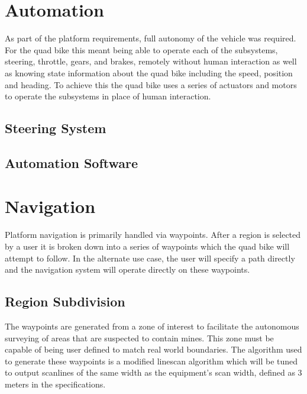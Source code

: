 \documentclass[main.tex]{subfiles}
\begin{document}
\section{Automation}

As part of the platform requirements, full autonomy of the vehicle was required. For the quad bike this meant being able to operate each of the subsystems, steering, throttle, gears, and brakes, remotely without human interaction as well as knowing state information about the quad bike including the speed, position and heading. To achieve this the quad bike uses a series of actuators and motors to operate the subsystems in place of human interaction.

\subsection{Steering System}

\subsection{Automation Software}

\section{Navigation}
Platform navigation is primarily handled via waypoints. After a region is selected by a user it is broken down into a series of waypoints which the quad bike will attempt to follow. In the alternate use case, the user will specify a path directly and the navigation system will operate directly on these waypoints.

\subsection{Region Subdivision}
The waypoints are generated from a zone of interest to facilitate the autonomous surveying of areas that are suspected to contain mines. This zone must be capable of being user defined to match real world boundaries. The algorithm used to generate these waypoints is a modified linescan algorithm which will be tuned to output scanlines of the same width as the equipment's scan width, defined as 3 meters in the specifications.
\end{document}
